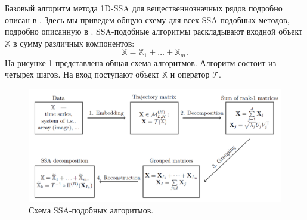 \documentclass[specialist,
               substylefile = spbu.rtx,
               subf,href,colorlinks=true, 12pt]{disser}
\begin{document}
Базовый алгоритм метода 1D-SSA для вещественнозначных рядов подробно описан в \cite{Golyandina.etal2001}.
Здесь мы приведем общую схему для всех SSA-подобных методов, подробно описанную в \cite{Rssa}.
SSA-подобные алгоритмы раскладывают входной объект $\mathbb{X}$ в сумму различных компонентов:
\begin{equation*}
\mathbb{X} = {\mathbb{X}}_1 + \ldots + {\mathbb{X}}_m.
\end{equation*}
На рисунке \ref{fig:ssa_scheme} представлена общая схема алгоритмов.
Алгоритм состоит из четырех шагов. На вход поступают объект $\mathbb{X}$ и оператор $\mathcal{T}$.
\begin{figure}[!hhh]
	\begin{center}
	\includegraphics[width = 6in]{scheme_ssa}
	\end{center}
	\caption{Схема SSA-подобных алгоритмов.}
	\label{fig:ssa_scheme}
\end{figure}
\end{document}
